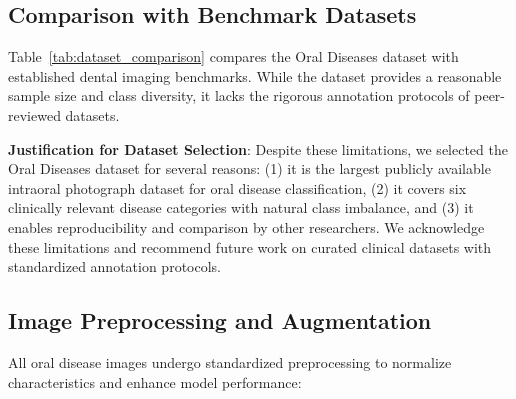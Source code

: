 \subsection{Comparison with Benchmark Datasets}

Table~\ref{tab:dataset_comparison} compares the Oral Diseases dataset with established dental imaging benchmarks. While the dataset provides a reasonable sample size and class diversity, it lacks the rigorous annotation protocols of peer-reviewed datasets.

\begin{table}[htbp]
\centering
\caption{Comparison with established dental imaging datasets}
\label{tab:dataset_comparison}
\end{table}

\textbf{Justification for Dataset Selection}: Despite these limitations, we selected the Oral Diseases dataset for several reasons: (1) it is the largest publicly available intraoral photograph dataset for oral disease classification, (2) it covers six clinically relevant disease categories with natural class imbalance, and (3) it enables reproducibility and comparison by other researchers. We acknowledge these limitations and recommend future work on curated clinical datasets with standardized annotation protocols.

\subsection{Image Preprocessing and Augmentation}

All oral disease images undergo standardized preprocessing to normalize characteristics and enhance model performance:


